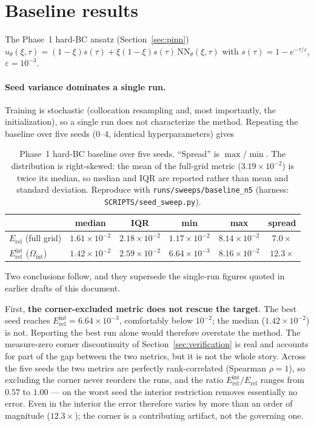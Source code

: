 \documentclass[11pt]{article}
\begin{document}
\section{Baseline results}
\label{sec:results}

The Phase~1 hard-BC ansatz (Section~\ref{sec:pinn})
$u_\theta(\xi,\tau)=(1-\xi)s(\tau)+\xi(1-\xi)s(\tau)\,\mathrm{NN}_\theta(\xi,\tau)$
with $s(\tau)=1-e^{-\tau/\varepsilon}$, $\varepsilon=10^{-3}$.

\paragraph{Seed variance dominates a single run.}
Training is stochastic (collocation resampling and, most importantly, the
initialization), so a single run does not characterize the method. Repeating
the baseline over five seeds ($0$--$4$, identical hyperparameters) gives

\begin{table}[h]
\centering
\begin{tabular}{lccccc}
\toprule
 & median & IQR & min & max & spread \\
\midrule
$E_{\mathrm{rel}}$ (full grid)      & $1.61\times10^{-2}$ & $2.18\times10^{-2}$ & $1.17\times10^{-2}$ & $8.14\times10^{-2}$ & $7.0\times$ \\
$E_{\mathrm{rel}}^{\mathrm{int}}$ ($\Omega_{\mathrm{int}}$) & $1.42\times10^{-2}$ & $2.59\times10^{-2}$ & $6.64\times10^{-3}$ & $8.16\times10^{-2}$ & $12.3\times$ \\
\bottomrule
\end{tabular}
\caption{Phase~1 hard-BC baseline over five seeds. ``Spread'' is
$\max/\min$. The distribution is right-skewed: the mean of the full-grid metric
($3.19\times10^{-2}$) is twice its median, so median and IQR are reported
rather than mean and standard deviation. Reproduce with
\texttt{runs/sweeps/baseline\_n5} (harness: \texttt{SCRIPTS/seed\_sweep.py}).}
\label{tab:baseline_seeds}
\end{table}

Two conclusions follow, and they supersede the single-run figures quoted in
earlier drafts of this document.

First, \textbf{the corner-excluded metric does not rescue the target}. The best
seed reaches $E_{\mathrm{rel}}^{\mathrm{int}}=6.64\times10^{-3}$, comfortably
below $10^{-2}$; the median ($1.42\times10^{-2}$) is not. Reporting the best run
alone would therefore overstate the method. The measure-zero corner
discontinuity of Section~\ref{sec:verification} is real and accounts for part of
the gap between the two metrics, but it is not the whole story. Across the
five seeds the two metrics are perfectly rank-correlated (Spearman
$\rho=1$), so excluding the corner never reorders the runs, and the ratio
$E_{\mathrm{rel}}^{\mathrm{int}}/E_{\mathrm{rel}}$ ranges from $0.57$ to
$1.00$ --- on the worst seed the interior restriction removes essentially no
error. Even in the interior the error therefore varies by more than an order of
magnitude ($12.3\times$); the corner is a contributing artifact, not the
governing one.
\end{document}
